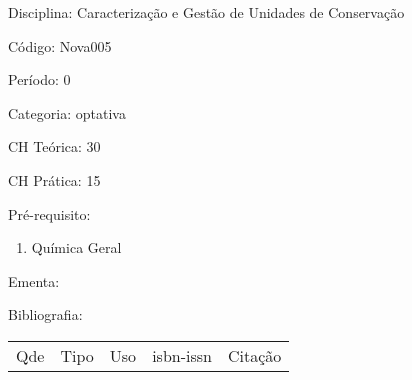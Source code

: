 \documentclass[12pt,a4paper,twoside]{report}
\begin{document}
Disciplina: Caracterização e Gestão de Unidades de Conservação

Código: Nova005

Período: 0

Categoria: optativa

CH Teórica: 30

CH Prática: 15




Pré-requisito:
\begin{enumerate}
\item Química Geral
\end{enumerate}

Ementa:
\begin{enumerate}
\end{enumerate}



Bibliografia:


\begin{tabular}{llllp{8cm}}
Qde & Tipo & Uso & isbn-issn & Citação \\
\end{tabular}
\end{document}
